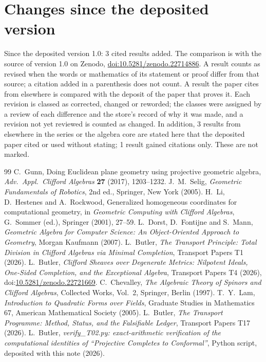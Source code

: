 \documentclass[11pt]{article}
\theoremstyle{definition}
\theoremstyle{plain}
\begin{document}
\section*{Changes since the deposited version}
Since the deposited version 1.0: 3 cited results added. The comparison is with the source of version 1.0 on Zenodo, \href{https://doi.org/10.5281/zenodo.22714886}{doi:10.5281/zenodo.22714886}. A result counts as revised when the words or mathematics of its statement or proof differ from that source; a citation added in a parenthesis does not count. A result the paper cites from elsewhere is compared with the deposit of the paper that proves it. Each revision is classed as corrected, changed or reworded; the classes were assigned by a review of each difference and the store's record of why it was made, and a revision not yet reviewed is counted as changed.
\noindent In addition, 3 results from elsewhere in the series or the algebra core are stated here that the deposited paper cited or used without stating; 1 result gained citations only. These are not marked.
\begin{thebibliography}{99}
 C.~Gunn,
Doing Euclidean plane geometry using projective geometric algebra,
\emph{Adv.\ Appl.\ Clifford Algebras} \textbf{27} (2017), 1203--1232.
 J.~M.~Selig,
\emph{Geometric Fundamentals of Robotics}, 2nd ed.,
Springer, New York (2005).
 H.~Li, D.~Hestenes and A.~Rockwood,
Generalized homogeneous coordinates for computational geometry,
in \emph{Geometric Computing with Clifford Algebras},
G.~Sommer (ed.), Springer (2001), 27--59.
 L.~Dorst, D.~Fontijne and S.~Mann,
\emph{Geometric Algebra for Computer Science: An Object-Oriented Approach to Geometry},
Morgan Kaufmann (2007).
 L.~Butler,
\emph{The Transport Principle: Total Division in Clifford Algebras via Minimal Completion},
Transport Papers T1 (2026).
 L.~Butler,
\emph{Clifford Sheaves over Degenerate Metrics: Nilpotent Ideals, One-Sided Completion, and the Exceptional Algebra},
Transport Papers T4 (2026), doi:\href{https://doi.org/10.5281/zenodo.22721669}{10.5281/zenodo.22721669}.
 C.~Chevalley,
\emph{The Algebraic Theory of Spinors and Clifford Algebras},
Collected Works, Vol.~2, Springer, Berlin (1997).
 T.~Y.~Lam,
\emph{Introduction to Quadratic Forms over Fields},
Graduate Studies in Mathematics 67, American Mathematical Society (2005).
 L.~Butler,
\emph{The Transport Programme: Method, Status, and the Falsifiable Ledger},
Transport Papers T17 (2026).
 L.~Butler,
\emph{verify\_T02.py: exact-arithmetic verification of the computational identities of ``Projective Completes to Conformal''},
Python script, deposited with this note (2026).
\end{thebibliography}
\end{document}
